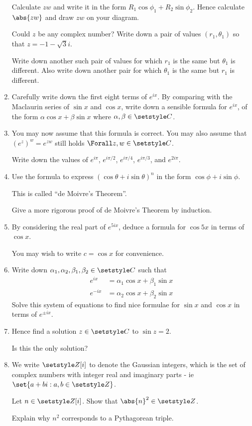 \begin{enumerate}
  Calculate \(zw\) and write it in the form
  \(R_1 \cos \phi_1 + R_2 \sin \phi_2\). Hence calculate \(\abs{zw}\) and draw
  \(zw\) on your diagram.

  Could \(z\) be any complex number? Write down a pair of values
  \((r_1, \theta_1)\) so that \(z = -1 - \sqrt 3i\).

  Write down another such pair of values for which \(r_1\) is the same but
  \(\theta_1\) is different. Also write down another pair for which
  \(\theta_1\) is the same but \(r_1\) is different.
 \item
  Carefully write down the first eight terms of \(e^{ix}\). By comparing with
  the Maclaurin series of \(\sin x\) and \(\cos x\), write down a sensible
  formula for \(e^{ix}\), of the form \(\alpha \cos x + \beta \sin x\) where
  \(\alpha, \beta \in \Complex\).
 \item
  You may now assume that this formula is correct. You may also assume that
  \((e^z)^w = e^{zw}\) still holds \(\Forall z, w \in \Complex\).

  Write down the values of \(e^{i\pi}\), \(e^{i\pi / 2}\),
  \(e^{i\pi / 4}\), \(e^{i\pi / 3}\), and \(e^{2 i \pi}\).
 \item
  Use the formula to express
  \((\cos \theta + i \sin \theta)^n\) in the form \(\cos \phi + i \sin \phi\).

  This is called ``de Moivre's Theorem''.

  Give a more rigorous proof of de Moivre's Theorem by induction.
 \item
  By considering the real part of
  \(e^{5ix}\), deduce a formula for \(\cos 5x\) in terms of \(\cos x\).

  You may wish to write \(c = \cos x\) for convenience.
 \item
  Write down \(\alpha_1, \alpha_2, \beta_1, \beta_2 \in \Complex\) such that
  \begin{align*}
   e^{ix} &= \alpha_1 \cos x + \beta_1 \sin x \\
   e^{-ix} &= \alpha_2 \cos x + \beta_2 \sin x
  \end{align*}
  Solve this system of equations to find nice formulae for
  \(\sin x\) and \(\cos x\) in terms of \(e^{\pm ix}\).
 \item
  Hence find a solution \(z \in \Complex\) to \(\sin z = 2\).

  Is this the only solution?
 \item
  We write \(\Integers[i]\) to denote the Gaussian integers, which is the set of
  complex numbers with integer real and imaginary parts - ie
  \(\set{a + bi : a, b \in \Integers}\).

  Let \(n \in \Integers[i]\). Show that \(\abs{n}^2 \in \Integers\).

  Explain why \(n^2\) corresponds to a Pythagorean triple.
\end{enumerate}
